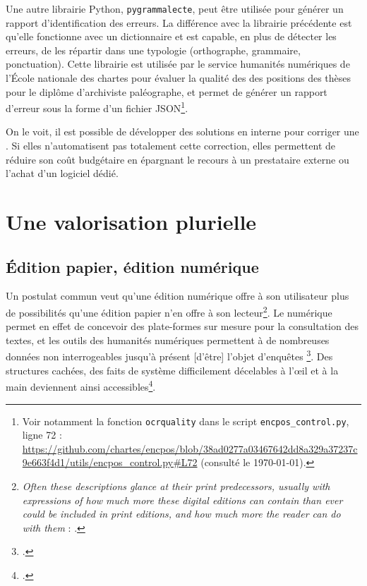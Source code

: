 Une autre librairie Python, \texttt{pygrammalecte}, peut être utilisée pour générer un rapport d'identification des erreurs. La différence avec la librairie précédente est qu'elle fonctionne avec un dictionnaire et est capable, en plus de détecter les erreurs, de les répartir dans une typologie (orthographe, grammaire, ponctuation). Cette librairie est utilisée par le service humanités numériques de l'École nationale des chartes pour évaluer la qualité des \ocr{} des positions des thèses pour le diplôme d'archiviste paléographe, et permet de générer un rapport d'erreur sous la forme d'un fichier JSON\footnote{Voir notamment la fonction \texttt{ocrquality} dans le script \texttt{encpos\_control.py}, ligne 72 : \url{https://github.com/chartes/encpos/blob/38ad0277a03467642dd8a329a37237c9e663f4d1/utils/encpos_control.py\#L72} (consulté le \today).}.

On le voit, il est possible de développer des solutions en interne pour corriger une \ocr. Si elles n'automatisent pas totalement cette correction, elles permettent de réduire son coût budgétaire en épargnant le recours à un prestataire externe ou l'achat d'un logiciel dédié.

\chapter{Une valorisation plurielle}

\section{Édition papier, édition numérique}

Un postulat commun veut qu'une édition numérique offre à son utilisateur plus de possibilités qu'une édition papier n'en offre à son lecteur\footnote{\og \textit{Often these descriptions glance at their print predecessors, usually with expressions of how much more these digital editions can contain than ever could be included in print editions, and how much more the reader can do with them} \fg{} : \cite[p. 105-106]{robinson}.}. Le numérique permet en effet de concevoir des plate-formes sur mesure pour la consultation des textes, et les outils des humanités numériques permettent à \og de nombreuses données non interrogeables jusqu’à présent [d'être] l’objet d’enquêtes \fg\footcite[p. 20]{duval}. \og Des structures cachées, des faits de système difficilement décelables à l’œil et à la main \fg{} deviennent ainsi accessibles\footcite{duval}.

